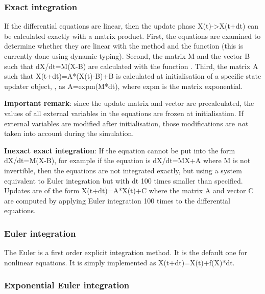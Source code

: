 \documentclass[letterpaper,10pt]{manual}
\begin{document}
\hypertarget{index-10}{}\subsubsection{Exact integration}

If the differential equations are linear, then the update phase
X(t)-\textgreater{}X(t+dt) can be calculated exactly with a matrix product.
First, the equations are examined to determine whether they are linear
with the method  and the function
 (this is currently done using dynamic typing).
Second, the matrix M and the vector B such that dX/dt=M(X-B) are calculated with
the function  \footnotemark[1].
Third, the matrix A such that X(t+dt)=A*(X(t)-B)+B is calculated at initialisation
of a specific state updater object, \hyperlink{brian.LinearStateUpdater}{},
as A=expm(M*dt), where expm is the matrix exponential.

\textbf{Important remark}: since the update matrix and vector are precalculated,
the values of all external variables in the equations are frozen at
initialisation. If external variables are modified after initialisation,
those modifications are \emph{not} taken into account during the simulation.

\textbf{Inexact exact integration}: If the equation cannot be put into the form dX/dt=M(X-B),
for example if the equation is dX/dt=MX+A where M is not invertible, then the equations
are not integrated exactly, but using a system equivalent to Euler integration but with
dt 100 times smaller than specified. Updates are of the form X(t+dt)=A*X(t)+C where the
matrix A and vector C are computed by applying Euler integration 100 times to the
differential equations.

\subsubsection{Euler integration}

The Euler is a first order explicit integration method. It is the default one for
nonlinear equations. It is simply implemented as X(t+dt)=X(t)+f(X)*dt.

\subsubsection{Exponential Euler integration}
\end{document}

